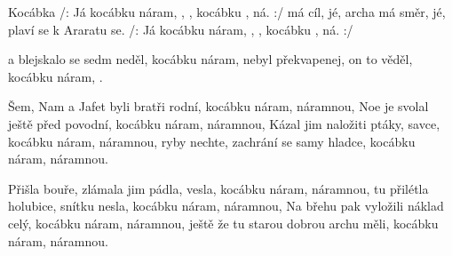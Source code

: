 \begin{TEXT}{Kocábka}
\REFREN /: Já  kocábku náram, , , 
kocábku , ná. :/
 má cíl, jé, archa má směr, jé, 
plaví se k Araratu  se. 
/: Já  kocábku náram, , , 
kocábku , ná. :/

\SLOKA {} a blejskalo se sedm neděl, 
kocábku náram,  
 nebyl překvapenej, on to věděl, 
kocábku náram, . 

\SLOKA Šem, Nam a Jafet byli bratři rodní, 
kocábku náram, náramnou, 
Noe je svolal ještě před povodní,
kocábku náram, náramnou, 
Kázal jim naložiti ptáky, savce, 
kocábku náram, náramnou, 
ryby nechte, zachrání se samy hladce,
kocábku náram, náramnou.


\SLOKA Přišla bouře, zlámala jim pádla, vesla, 
kocábku náram, náramnou, 
tu přilétla holubice, snítku nesla, 
kocábku náram, náramnou,
Na břehu pak vyložili náklad celý, 
kocábku náram, náramnou, 
ještě že tu starou dobrou archu měli, 
kocábku náram, náramnou. 

\end{TEXT}